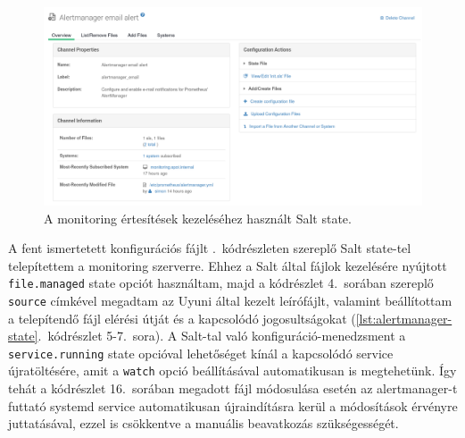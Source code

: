 \begin{figure}
	\centering
	\includegraphics[width=15cm]{figures/alertmanager-state.png}
	\caption{A monitoring értesítések kezeléséhez használt Salt state.}
	\label{fig:alertmanager-state}
\end{figure}

\begin{figure}[htb]
	
\end{figure}

A fent ismertetett konfigurációs fájlt .~kódrészleten szereplő Salt state-tel telepítettem a monitoring szerverre. Ehhez a Salt által fájlok kezelésére nyújtott \texttt{file.managed} state opciót használtam, majd a kódrészlet 4.~sorában szereplő \texttt{source} címkével megadtam az Uyuni által kezelt leírófájlt, valamint beállítottam a telepítendő fájl elérési útját és a kapcsolódó jogosultságokat (\ref{lst:alertmanager-state}.~kódrészlet 5-7.~sora). 
A Salt-tal való konfiguráció-menedzsment a \texttt{service.running} state opcióval lehetőséget kínál a kapcsolódó service újratöltésére, amit a \texttt{watch} opció beállításával automatikusan is megtehetünk. Így tehát a kódrészlet 16.~sorában megadott fájl módosulása esetén az alertmanager-t futtató systemd service automatikusan újraindításra kerül a módosítások érvényre juttatásával, ezzel is csökkentve a manuális beavatkozás szükségességét.

\begin{figure}[ht]
	
\end{figure}


